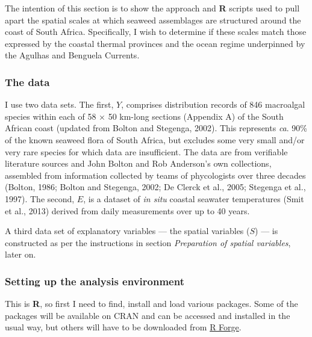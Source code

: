 \documentclass[10pt,A4,]{article}
\begin{document}
The intention of this section is to show the approach and \textbf{R}
scripts used to pull apart the spatial scales at which seaweed
assemblages are structured around the coast of South Africa.
Specifically, I wish to determine if these scales match those expressed
by the coastal thermal provinces and the ocean regime underpinned by the
Agulhas and Benguela Currents.

\subsubsection*{The data}

I use two data sets. The first, \(Y\), comprises distribution records of
846 macroalgal species within each of 58 × 50 km-long sections (Appendix
A) of the South African coast (updated from Bolton and Stegenga, 2002).
This represents \emph{ca}. 90\% of the known seaweed flora of South
Africa, but excludes some very small and/or very rare species for which
data are insufficient. The data are from verifiable literature sources
and John Bolton and Rob Anderson's own collections, assembled from
information collected by teams of phycologists over three decades
(Bolton, 1986; Bolton and Stegenga, 2002; De Clerck et al., 2005;
Stegenga et al., 1997). The second, \(E\), is a dataset of \emph{in
situ} coastal seawater temperatures (Smit et al., 2013) derived from
daily measurements over up to 40 years.

A third data set of explanatory variables --- the spatial variables
(\(S\)) --- is constructed as per the instructions in section
\emph{Preparation of spatial variables}, later on.

\subsubsection*{Setting up the analysis environment}

This is \textbf{R}, so first I need to find, install and load various
packages. Some of the packages will be available on CRAN and can be
accessed and installed in the usual way, but others will have to be
downloaded from \href{https://r-forge.r-project.org/R/?group_id=195}{R
Forge}.
\end{document}

